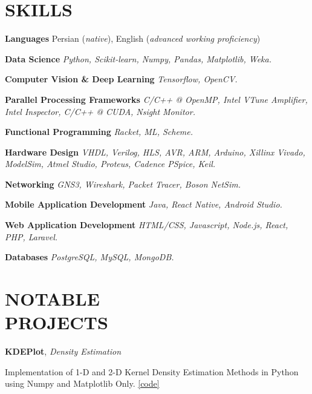 \documentclass[margin, 10pt]{res} %
\begin{document}
	\section{SKILLS}
	
	\textbf{Languages }
	Persian (\emph{native}), English (\emph{advanced working proficiency})
	
	\textbf{Data Science}
	\textit{Python, Scikit-learn, Numpy, Pandas, Matplotlib, Weka.}
	
	\textbf{Computer Vision \& Deep Learning}
	\textit{Tensorflow, OpenCV.}
	
	\textbf{Parallel Processing Frameworks}
	\textit{C/C++ @ OpenMP, Intel VTune Amplifier, Intel Inspector, C/C++ @ CUDA, Nsight Monitor.}
	
	\textbf{Functional Programming}
	\textit{Racket, ML, Scheme.}

	\textbf{Hardware Design}
	\textit{VHDL, Verilog, HLS, AVR, ARM, Arduino, Xillinx Vivado, ModelSim, Atmel Studio, Proteus, Cadence PSpice, Keil.}
	
	\textbf{Networking}
	\textit{GNS3, Wireshark, Packet Tracer, Boson NetSim.}

	\textbf{Mobile Application Development}
	\textit{Java, React Native, Android Studio.}
	
	
	\textbf{Web Application Development}
	\textit{HTML/CSS, Javascript, Node.js, React, PHP, Laravel.}
	
	\textbf{Databases}
	\textit{PostgreSQL, MySQL, MongoDB.}
	

\section{NOTABLE \\ PROJECTS}

	\textbf{KDEPlot}, 
\textit{Density Estimation}
\begin{innerlist}
	\item Implementation of 1-D and 2-D Kernel Density Estimation Methods in Python using Numpy and Matplotlib Only.
	\hfill{\UrlFont\href{https://github.com/aligholamee/KDEPlot}{[code]}}
\end{innerlist}
\end{document}
